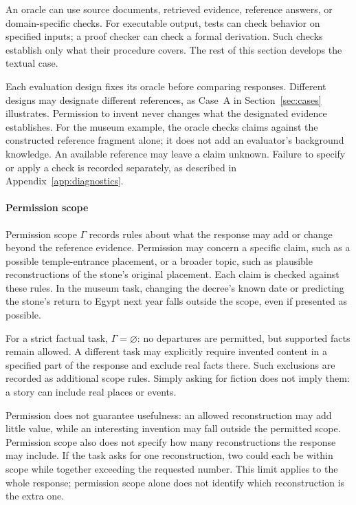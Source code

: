 \documentclass{clv2025}
\begin{document}
An oracle can use source documents, retrieved evidence, reference answers,
or domain-specific checks. For executable output, tests can check behavior
on specified inputs; a proof checker can check a formal derivation. Such
checks establish only what their procedure covers. The rest of this section
develops the textual case.

Each evaluation design fixes its oracle before comparing responses. Different
designs may designate different references, as Case~A in
Section~\ref{sec:cases} illustrates. Permission to invent never changes what
the designated evidence establishes. For the museum example, the oracle
checks claims against the constructed reference fragment alone; it does
not add an evaluator's background knowledge. An available reference may
leave a claim unknown. Failure to specify or apply a check is recorded
separately, as described in Appendix~\ref{app:diagnostics}.

\paragraph{Permission scope}
Permission scope $\Gamma$ records rules about what the response may add or
change beyond the reference evidence. Permission may concern a specific
claim, such as a possible temple-entrance placement, or a broader topic, such
as plausible reconstructions of the stone's original placement. Each claim
is checked against these rules. In the museum task, changing the decree's
known date or predicting the stone's return to Egypt next year falls outside
the scope, even if presented as possible.

For a strict factual task, $\Gamma=\varnothing$: no departures are permitted,
but supported facts remain allowed. A different task may explicitly require
invented content in a specified part of the response and exclude real facts
there. Such exclusions are recorded as additional scope rules. Simply asking
for fiction does not imply them: a story can include real places or events.

Permission does not guarantee usefulness: an allowed reconstruction may add
little value, while an interesting invention may fall outside the permitted
scope. Permission scope also does not specify how many reconstructions the
response may include. If the task asks for one reconstruction, two could each
be within scope while together exceeding the requested number. This limit
applies to the whole response; permission scope alone does not identify which
reconstruction is the extra one.
\end{document}
